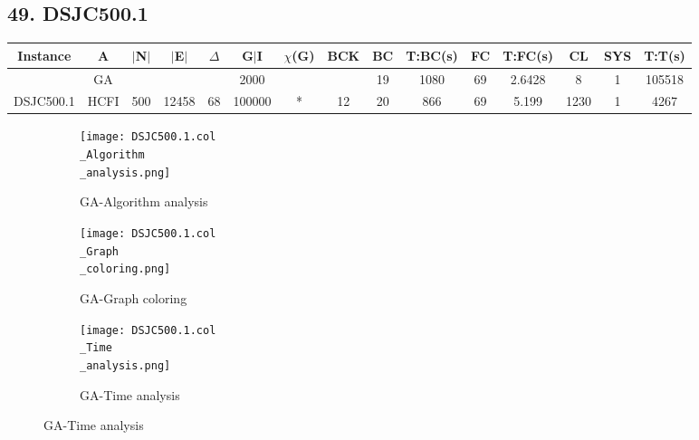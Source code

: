 \documentclass[10pt]{article}
\begin{document}
\subsection*{\hspace{0,9073976cm} 49. DSJC500.1}
\begin{table}[H]
\centering
\begin{tabular}{|c|c|c|c|c|c|c|c|c|c|c|c|c|c|c|}
\hline
Instance& A &$|$N$|$ & $|$E$|$ & $\Delta$ & G$|$I & $\chi$(G) &BCK&BC & T:BC(s) & FC & T:FC(s) & CL & SYS & T:T(s) \\ \hline \hline
	&GA&       &                   &                     &   2000      &     \cellcolor{yellow} & {\cellcolor{yellow}}& {{\cellcolor{green}19}}
&1080   &69        &2.6428                   &8                    & 1         &105518        \\ \cline{2-2} \cline{6-6} \cline{9-15}
 \multirow{-2}{*}{DSJC500.1} &HCFI   &\multirow{-2}{*}{500}   &\multirow{-2}{*}{12458}     &\multirow{-2}{*}{68}     &100000     &\multirow{-2}{*}{\cellcolor{yellow}*}      & \multirow{-2}{*}{\cellcolor{yellow}12}    &{\cellcolor{green}20}     &866         &69    &5.199         &1230    &1     &4267        \\ \hline 
\end{tabular}
\end{table}
\graphicspath{{./Core1/Solutions/GA/DSJC500.1.col}}
\begin{figure}[H]
\begin{subfigure}{.33\textwidth}
  \centering
  \texttt{[image: DSJC500.1.col\\\_Algorithm\\\_analysis.png]}
  \caption{GA-Algorithm analysis}
   \label{fig:subfig1}
\end{subfigure}%
\begin{subfigure}{.33\textwidth}
  \centering
  \texttt{[image: DSJC500.1.col\\\_Graph\\\_coloring.png]}
  \caption{GA-Graph coloring}
  \label{fig:subfig2}
\end{subfigure}
\begin{subfigure}{.33\textwidth}
  \centering
  \texttt{[image: DSJC500.1.col\\\_Time\\\_analysis.png]}
  \caption{GA-Time analysis}
  \end{subfigure}
\end{figure}
\end{document}
